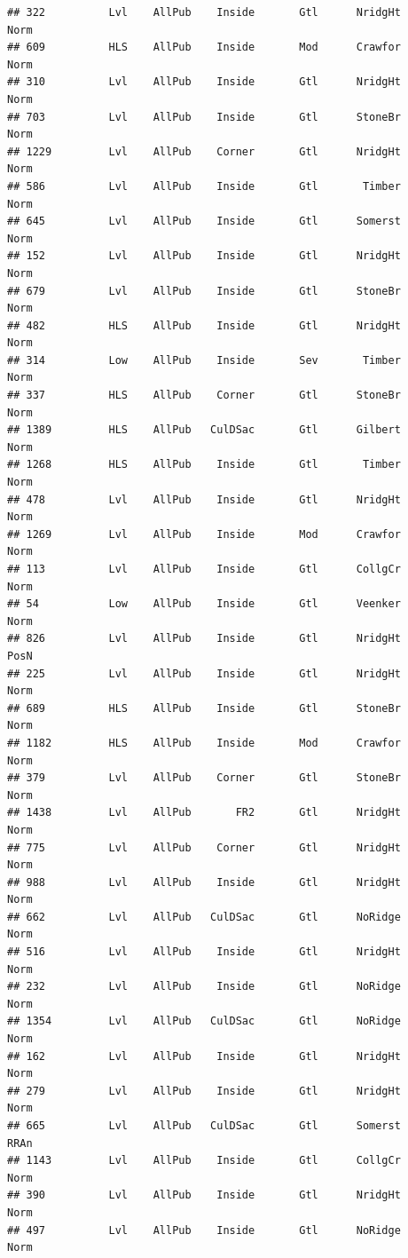 \documentclass[]{article}
\begin{document}
\begin{verbatim}
## 322          Lvl    AllPub    Inside       Gtl      NridgHt       Norm
## 609          HLS    AllPub    Inside       Mod      Crawfor       Norm
## 310          Lvl    AllPub    Inside       Gtl      NridgHt       Norm
## 703          Lvl    AllPub    Inside       Gtl      StoneBr       Norm
## 1229         Lvl    AllPub    Corner       Gtl      NridgHt       Norm
## 586          Lvl    AllPub    Inside       Gtl       Timber       Norm
## 645          Lvl    AllPub    Inside       Gtl      Somerst       Norm
## 152          Lvl    AllPub    Inside       Gtl      NridgHt       Norm
## 679          Lvl    AllPub    Inside       Gtl      StoneBr       Norm
## 482          HLS    AllPub    Inside       Gtl      NridgHt       Norm
## 314          Low    AllPub    Inside       Sev       Timber       Norm
## 337          HLS    AllPub    Corner       Gtl      StoneBr       Norm
## 1389         HLS    AllPub   CulDSac       Gtl      Gilbert       Norm
## 1268         HLS    AllPub    Inside       Gtl       Timber       Norm
## 478          Lvl    AllPub    Inside       Gtl      NridgHt       Norm
## 1269         Lvl    AllPub    Inside       Mod      Crawfor       Norm
## 113          Lvl    AllPub    Inside       Gtl      CollgCr       Norm
## 54           Low    AllPub    Inside       Gtl      Veenker       Norm
## 826          Lvl    AllPub    Inside       Gtl      NridgHt       PosN
## 225          Lvl    AllPub    Inside       Gtl      NridgHt       Norm
## 689          HLS    AllPub    Inside       Gtl      StoneBr       Norm
## 1182         HLS    AllPub    Inside       Mod      Crawfor       Norm
## 379          Lvl    AllPub    Corner       Gtl      StoneBr       Norm
## 1438         Lvl    AllPub       FR2       Gtl      NridgHt       Norm
## 775          Lvl    AllPub    Corner       Gtl      NridgHt       Norm
## 988          Lvl    AllPub    Inside       Gtl      NridgHt       Norm
## 662          Lvl    AllPub   CulDSac       Gtl      NoRidge       Norm
## 516          Lvl    AllPub    Inside       Gtl      NridgHt       Norm
## 232          Lvl    AllPub    Inside       Gtl      NoRidge       Norm
## 1354         Lvl    AllPub   CulDSac       Gtl      NoRidge       Norm
## 162          Lvl    AllPub    Inside       Gtl      NridgHt       Norm
## 279          Lvl    AllPub    Inside       Gtl      NridgHt       Norm
## 665          Lvl    AllPub   CulDSac       Gtl      Somerst       RRAn
## 1143         Lvl    AllPub    Inside       Gtl      CollgCr       Norm
## 390          Lvl    AllPub    Inside       Gtl      NridgHt       Norm
## 497          Lvl    AllPub    Inside       Gtl      NoRidge       Norm

\end{verbatim}
\end{document}
